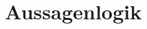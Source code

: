 \documentclass[a4paper]{scrartcl}
\begin{document}
\tableofcontents
\newpage

%




\section{Aussagenlogik}
\end{document}
